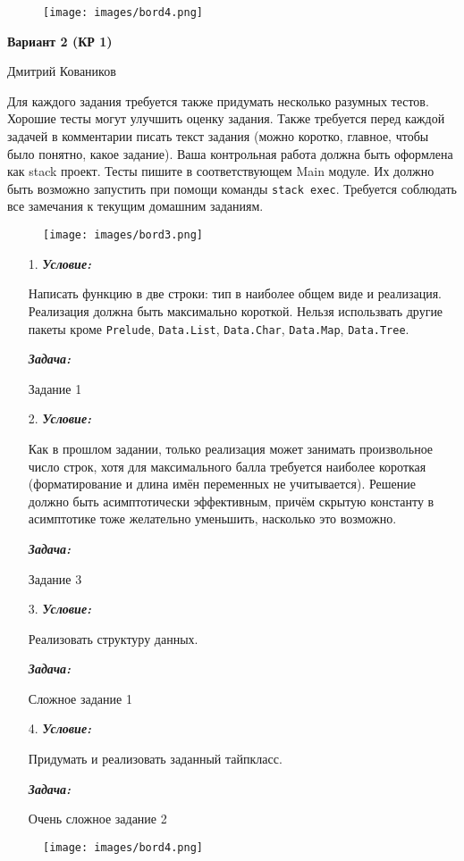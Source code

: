 \documentclass[11pt,a4paper]{article}
\begin{document}
\begin{figure}[H]
  \centering
  \texttt{[image: images/bord4.png]}
\end{figure}

\pagebreak

%
%

\begin{center}
  \textbf{\LARGE{Вариант 2 (КР 1)} \\}

  Дмитрий Коваников
\end{center}

Для каждого задания требуется также придумать несколько разумных тестов. Хорошие тесты могут улучшить оценку задания. Также требуется перед каждой задачей в комментарии писать текст задания (можно коротко, главное, чтобы было понятно, какое задание). Ваша контрольная работа должна быть оформлена как stack проект. Тесты пишите в соответствующем Main модуле. Их должно быть возможно запустить при помощи команды \texttt{stack exec}. Требуется соблюдать все замечания к текущим домашним заданиям.

\begin{figure}[H]
  \centering
  \texttt{[image: images/bord3.png]}
\end{figure}

\begin{enumerate}
  \item[1.]
  \textbf{\textit{Условие:}}

Написать функцию в две строки: тип в наиболее общем виде и реализация. Реализация должна быть максимально короткой. Нельзя использвать другие пакеты кроме \texttt{Prelude}, \texttt{Data.List}, \texttt{Data.Char}, \texttt{Data.Map}, \texttt{Data.Tree}.

  \textbf{\textit{Задача:}}

Задание 1
  \item[2.]
  \textbf{\textit{Условие:}}

Как в прошлом задании, только реализация может занимать произвольное число строк, хотя для максимального балла требуется наиболее короткая (форматирование и длина имён переменных не учитывается). Решение должно быть асимптотически эффективным, причём скрытую константу в асимптотике тоже желательно уменьшить, насколько это возможно.

  \textbf{\textit{Задача:}}

Задание 3
  \item[3.]
  \textbf{\textit{Условие:}}

Реализовать структуру данных.

  \textbf{\textit{Задача:}}

Сложное задание 1
  \item[4.]
  \textbf{\textit{Условие:}}

Придумать и реализовать заданный тайпкласс.

  \textbf{\textit{Задача:}}

Очень сложное задание 2
\end{enumerate}

\begin{figure}[H]
  \centering
  \texttt{[image: images/bord4.png]}
\end{figure}

\pagebreak
\end{document}
